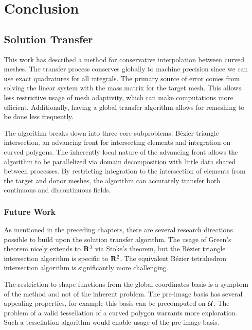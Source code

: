 \chapter{Conclusion}

\section{Solution Transfer}

This work has described a method for conservative interpolation
between curved meshes. The transfer process conserves globally
to machine precision since we can use exact quadratures for all
integrals. The primary source of error comes from solving the linear
system with the mass matrix for the target mesh. This allows
less restrictive usage of mesh adaptivity, which can make computations
more efficient. Additionally, having a global transfer algorithm
allows for remeshing to be done less frequently.

The algorithm breaks down into three core subproblems: B\'{e}zier triangle
intersection, an advancing front for intersecting elements and
integration on curved polygons. The inherently local nature of the
advancing front allows the algorithm to be parallelized via domain
decomposition with little data shared between processes. By
restricting integration to the intersection of elements from the
target and donor meshes, the algorithm can accurately transfer
both continuous and discontinuous fields.

\subsection{Future Work}

As mentioned in the preceding chapters, there are several research
directions possible to build upon the solution transfer algorithm.
The usage of Green's theorem nicely extends to \(\mathbf{R}^3\) via
Stoke's theorem, but the B\'{e}zier triangle intersection algorithm
is specific to \(\mathbf{R}^2\). The equivalent B\'{e}zier tetrahedron
intersection algorithm is significantly more challenging.

The restriction to shape functions from the global coordinates basis
is a symptom of the method and not of the inherent problem. The
pre-image basis has several appealing properties, for example
this basis can be precomputed on \(\mathcal{U}\). The problem of a
valid tessellation of a curved polygon warrants more exploration.
Such a tessellation algorithm would enable usage of the pre-image
basis.

